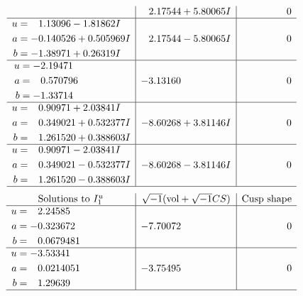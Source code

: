 \documentclass[1p]{elsarticle_modified}
\theoremstyle{definition}
\newcommand{\I}{\sqrt{-1}}
\begin{document}
$$\begin{array}{c|c|c}
 & \phantom{-}2.17544 + 5.80065 I & \phantom{-0.000000 } 0 \\ \hline\begin{aligned}
u &= \phantom{-}1.13096 - 1.81862 I \\
a &= -0.140526 + 0.505969 I \\
b &= -1.38971 + 0.26319 I\end{aligned}
 & \phantom{-}2.17544 - 5.80065 I & \phantom{-0.000000 } 0 \\ \hline\begin{aligned}
u &= -2.19471\phantom{ +0.000000I} \\
a &= \phantom{-}0.570796\phantom{ +0.000000I} \\
b &= -1.33714\phantom{ +0.000000I}\end{aligned}
 & -3.13160\phantom{ +0.000000I} & \phantom{-0.000000 } 0 \\ \hline\begin{aligned}
u &= \phantom{-}0.90971 + 2.03841 I \\
a &= \phantom{-}0.349021 + 0.532377 I \\
b &= \phantom{-}1.261520 + 0.388603 I\end{aligned}
 & -8.60268 + 3.81146 I & \phantom{-0.000000 } 0 \\ \hline\begin{aligned}
u &= \phantom{-}0.90971 - 2.03841 I \\
a &= \phantom{-}0.349021 - 0.532377 I \\
b &= \phantom{-}1.261520 - 0.388603 I\end{aligned}
 & -8.60268 - 3.81146 I & \phantom{-0.000000 } 0\\
 \hline 
 \end{array}$$\newpage$$\begin{array}{c|c|c}  
\text{Solutions to }I^u_{1}& \I (\text{vol} + \sqrt{-1}CS) & \text{Cusp shape}\\
 \hline 
\begin{aligned}
u &= \phantom{-}2.24585\phantom{ +0.000000I} \\
a &= -0.323672\phantom{ +0.000000I} \\
b &= \phantom{-}0.0679481\phantom{ +0.000000I}\end{aligned}
 & -7.70072\phantom{ +0.000000I} & \phantom{-0.000000 } 0 \\ \hline\begin{aligned}
u &= -3.53341\phantom{ +0.000000I} \\
a &= \phantom{-}0.0214051\phantom{ +0.000000I} \\
b &= \phantom{-}1.29639\phantom{ +0.000000I}\end{aligned}
 & -3.75495\phantom{ +0.000000I} & \phantom{-0.000000 } 0\\
 \hline 
 \end{array}$$\newpage\newpage\renewcommand{\arraystretch}{1}
\end{document}
